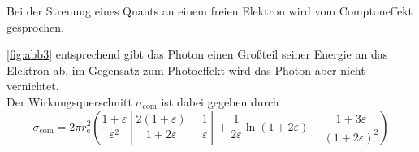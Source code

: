 Bei der Streuung eines Quants an einem freien Elektron wird vom
Comptoneffekt gesprochen.


\autoref{fig:abb3} entsprechend gibt das Photon einen Großteil
seiner Energie an das Elektron ab, im Gegensatz zum Photoeffekt
wird das Photon aber nicht vernichtet. \\

Der Wirkungsquerschnitt $\sigma_{\mathrm{com}}$ ist dabei gegeben durch
\begin{equation}
    \sigma_{\mathrm{com}} = 2 \pi r^2_\mathrm{e} 
    \left(\frac{1 + \varepsilon}{\varepsilon^2} 
    \left[\frac{2(1 + \varepsilon)}{1 + 2 \varepsilon} -\frac{1}{\varepsilon}\right]
    + \frac{1}{2 \varepsilon} \ln(1 + 2 \varepsilon) 
    - \frac{1 + 3 \varepsilon}{(1 + 2 \varepsilon)^2}\right)
    \label{eq:wirkungsquercompton}
\end{equation}